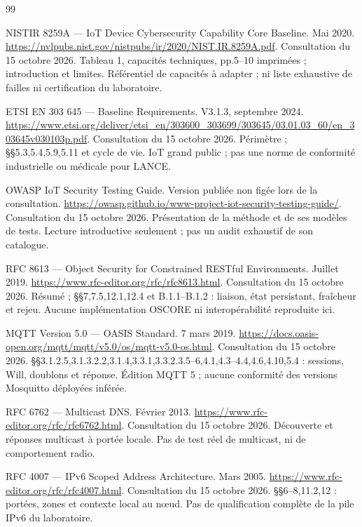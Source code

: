 \documentclass[11pt,a4paper]{article}
\begin{document}
\begin{thebibliography}{99}\small\raggedright
{}
 NISTIR 8259A --- IoT Device Cybersecurity Capability Core Baseline. Mai 2020. \url{https://nvlpubs.nist.gov/nistpubs/ir/2020/NIST.IR.8259A.pdf}. Consultation du 15 octobre 2026. Tableau 1, capacités techniques, pp.5--10 imprimées ; introduction et limites. Référentiel de capacités à adapter ; ni liste exhaustive de failles ni certification du laboratoire.

 ETSI EN 303 645 --- Baseline Requirements. V3.1.3, septembre 2024. \url{https://www.etsi.org/deliver/etsi_en/303600_303699/303645/03.01.03_60/en_303645v030103p.pdf}. Consultation du 15 octobre 2026. Périmètre ; §§5.3,5.4,5.9,5.11 et cycle de vie. IoT grand public ; pas une norme de conformité industrielle ou médicale pour LANCE.

 OWASP IoT Security Testing Guide. Version publiée non figée lors de la consultation. \url{https://owasp.github.io/www-project-iot-security-testing-guide/}. Consultation du 15 octobre 2026. Présentation de la méthode et de ses modèles de tests. Lecture introductive seulement ; pas un audit exhaustif de son catalogue.

 RFC 8613 --- Object Security for Constrained RESTful Environments. Juillet 2019. \url{https://www.rfc-editor.org/rfc/rfc8613.html}. Consultation du 15 octobre 2026. Résumé ; §§7,7.5,12.1,12.4 et B.1.1--B.1.2 : liaison, état persistant, fraîcheur et rejeu. Aucune implémentation OSCORE ni interopérabilité reproduite ici.

 MQTT Version 5.0 --- OASIS Standard. 7 mars 2019. \url{https://docs.oasis-open.org/mqtt/mqtt/v5.0/os/mqtt-v5.0-os.html}. Consultation du 15 octobre 2026. §§3.1.2.5,3.1.3.2.2,3.1.4,3.3.1,3.3.2.3.5--6,4.1,4.3--4.4,4.6,4.10,5.4 : sessions, Will, doublons et réponse. Édition MQTT 5 ; aucune conformité des versions Mosquitto déployées inférée.

 RFC 6762 --- Multicast DNS. Février 2013. \url{https://www.rfc-editor.org/rfc/rfc6762.html}. Consultation du 15 octobre 2026. Découverte et réponses multicast à portée locale. Pas de test réel de multicast, ni de comportement radio.

 RFC 4007 --- IPv6 Scoped Address Architecture. Mars 2005. \url{https://www.rfc-editor.org/rfc/rfc4007.html}. Consultation du 15 octobre 2026. §§6--8,11.2,12 : portées, zones et contexte local au nœud. Pas de qualification complète de la pile IPv6 du laboratoire.


\end{thebibliography}
\end{document}
